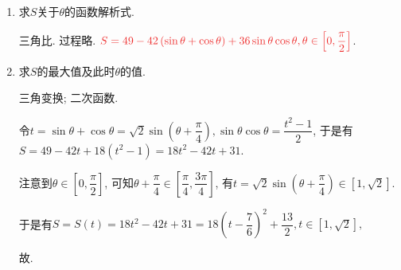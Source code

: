 \documentclass[8pt]{article}
\begin{document}
		\begin{enumerate}[label=(\arabic*)]
			\item 求$S$关于$\theta$的函数解析式.

				三角比. 过程略. $\ansmath{S=49-42\left(\sin \theta + \cos \theta\right)+36\sin\theta\cos\theta, \theta\in\left[0, \dfrac{\pi}{2}\right]}$.

			\item 求$S$的最大值及此时$\theta$的值.

				三角变换; 二次函数.

				令$t=\sin \theta + \cos \theta = \sqrt{2} \sin \left(\theta + \dfrac{\pi}{4}\right), \sin \theta \cos \theta = \dfrac{t^2 - 1}{2}$, 于是有$S=49-42t+18\left(t^2-1\right)=18t^2-42t+31$.

				注意到$\theta \in \left[0, \dfrac{\pi}{2}\right]$, 可知$\theta + \dfrac{\pi}{4} \in \left[\dfrac{\pi}{4}, \dfrac{3\pi}{4}\right]$, 有$t=\sqrt{2}\sin\left(\theta + \dfrac{\pi}{4}\right)\in\left[1, \sqrt{2}\right]$.

				于是有$S=S(t)=18t^2-42t+31=18\left(t-\dfrac{7}{6}\right)^2+\dfrac{13}{2}, t\in\left[1, \sqrt{2}\right],$

				故.

		\end{enumerate}
\end{document}
